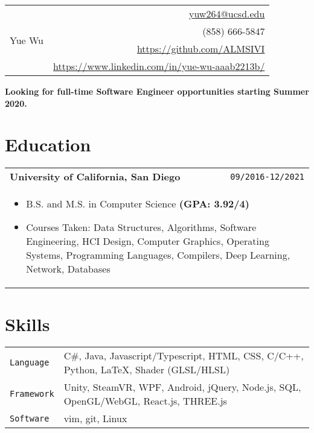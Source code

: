 \documentclass[10pt, letterpaper]{article}
\newcommand{\itemcols}[1]{
\multicolumn{2}{p{\dimexpr \linewidth-2\tabcolsep}}{
\begin{itemize}
#1
\end{itemize}
}
}
\begin{document}
\noindent
\begin{tabularx}{\linewidth}{X r}
\multirow{4}{*}{{\fontsize{45}{55}\selectfont Yue Wu}}
& \href{mailto:yuw264@ucsd.edu}{yuw264@ucsd.edu} \\
& (858) 666-5847 \\
& \href{https://github.com/ALMSIVI}{https://github.com/ALMSIVI} \\
& \href{https://www.linkedin.com/in/yue-wu-aaab2213b/}{https://www.linkedin.com/in/yue-wu-aaab2213b/}
\end{tabularx}
\noindent
\textbf{Looking for full-time Software Engineer opportunities starting Summer 2020.}
\section{Education}
\smallskip
\noindent
\begin{tabularx}{\linewidth}{X r}
\textbf{\large University of California, San Diego} & \texttt{09/2016-12/2021} \\
\itemcols{
\item B.S. and M.S. in Computer Science \textbf{(GPA: 3.92/4)}
\item Courses Taken: Data Structures, Algorithms, Software Engineering, HCI Design, Computer Graphics, Operating Systems, Programming Languages, Compilers, Deep Learning, Network, Databases
}
\end{tabularx}
\section{Skills}
\smallskip
\noindent
\begin{tabularx}{\linewidth}{l X}
\texttt{Language} & C\#, Java, Javascript/Typescript, HTML, CSS, C/C++, Python, \LaTeX, Shader (GLSL/HLSL) \\
\texttt{Framework} & Unity, SteamVR, WPF, Android, jQuery, Node.js, SQL, OpenGL/WebGL, React.js, THREE.js \\
\texttt{Software} & vim, git, Linux
\end{tabularx}
\end{document}
